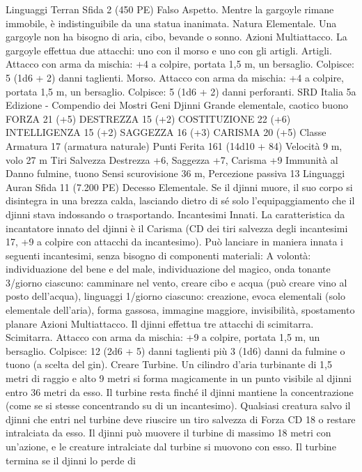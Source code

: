 \begin{multicols}{2}
Linguaggi Terran
Sfida 2 (450 PE)
Falso Aspetto. Mentre la gargoyle rimane immobile, è
indistinguibile da una statua inanimata.
Natura Elementale. Una gargoyle non ha bisogno di aria, cibo,
bevande o sonno.
Azioni
Multiattacco. La gargoyle effettua due attacchi: uno con il morso
e uno con gli artigli.
Artigli. Attacco con arma da mischia: +4 a colpire, portata 1,5
m, un bersaglio.
Colpisce: 5 (1d6 + 2) danni taglienti.
Morso. Attacco con arma da mischia: +4 a colpire, portata 1,5
m, un bersaglio.
Colpisce: 5 (1d6 + 2) danni perforanti.
SRD Italia 5a Edizione - Compendio dei Mostri
Geni
Djinni
Grande elementale, caotico buono
FORZA 21 (+5)
DESTREZZA 15 (+2)
COSTITUZIONE 22 (+6)
INTELLIGENZA 15 (+2)
SAGGEZZA 16 (+3)
CARISMA 20 (+5)
Classe Armatura 17 (armatura naturale)
Punti Ferita 161 (14d10 + 84)
Velocità 9 m, volo 27 m
Tiri Salvezza Destrezza +6, Saggezza +7, Carisma +9
Immunità al Danno fulmine, tuono
Sensi scurovisione 36 m, Percezione passiva 13
Linguaggi Auran
Sfida 11 (7.200 PE)
Decesso Elementale. Se il djinni muore, il suo corpo si
disintegra in una brezza calda, lasciando dietro di sé solo
l’equipaggiamento che il djinni stava indossando o trasportando.
Incantesimi Innati. La caratteristica da incantatore innato del
djinni è il Carisma (CD dei tiri salvezza degli incantesimi 17, +9
a colpire con attacchi da incantesimo). Può lanciare in maniera
innata i seguenti incantesimi, senza bisogno di componenti
materiali:
A volontà: individuazione del bene e del male, individuazione del
magico, onda tonante
3/giorno ciascuno: camminare nel vento, creare cibo e acqua
(può creare vino al posto dell’acqua), linguaggi
1/giorno ciascuno: creazione, evoca elementali (solo elementale
dell’aria), forma gassosa, immagine maggiore, invisibilità,
spostamento planare
Azioni
Multiattacco. Il djinni effettua tre attacchi di scimitarra.
Scimitarra. Attacco con arma da mischia: +9 a colpire, portata
1,5 m, un bersaglio.
Colpisce: 12 (2d6 + 5) danni taglienti più 3 (1d6) danni da
fulmine o tuono (a scelta del gin).
Creare Turbine. Un cilindro d’aria turbinante di 1,5 metri di
raggio e alto 9 metri si forma magicamente in un punto visibile al
djinni entro 36 metri da esso. Il turbine resta finché il djinni
mantiene la concentrazione (come se si stesse concentrando su di
un incantesimo). Qualsiasi creatura salvo il djinni che entri nel
turbine deve riuscire un tiro salvezza di Forza CD 18 o restare
intralciata da esso. Il djinni può muovere il turbine di massimo
18 metri con un’azione, e le creature intralciate dal turbine si
muovono con esso. Il turbine termina se il djinni lo perde di

\end{multicols}
